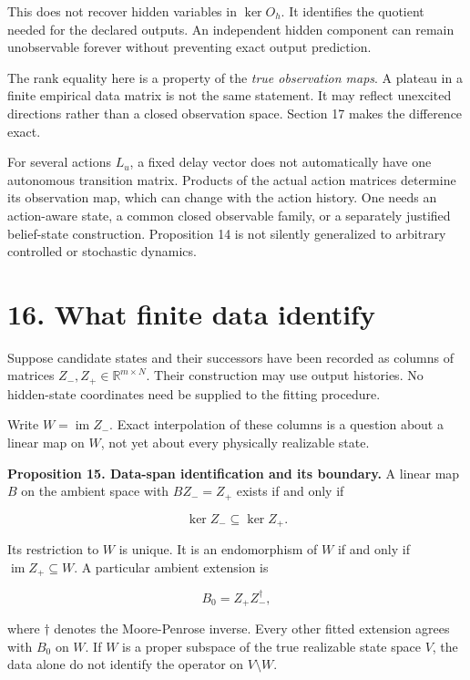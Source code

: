 \documentclass[11pt,letterpaper]{article}
\begin{document}
This does not recover hidden variables in \(\ker O_h\). It identifies
the quotient needed for the declared outputs. An independent hidden
component can remain unobservable forever without preventing exact
output prediction.

The rank equality here is a property of the \emph{true observation
maps}. A plateau in a finite empirical data matrix is not the same
statement. It may reflect unexcited directions rather than a closed
observation space. Section 17 makes the difference exact.

For several actions \(L_u\), a fixed delay vector does not automatically
have one autonomous transition matrix. Products of the actual action
matrices determine its observation map, which can change with the action
history. One needs an action-aware state, a common closed observable
family, or a separately justified belief-state construction. Proposition
14 is not silently generalized to arbitrary controlled or stochastic
dynamics.

\section{16. What finite data identify}\label{what-finite-data-identify}

Suppose candidate states and their successors have been recorded as
columns of matrices \(Z_-,Z_+\in\mathbb R^{m\times N}\). Their
construction may use output histories. No hidden-state coordinates need
be supplied to the fitting procedure.

Write \(W=\operatorname{im}Z_-\). Exact interpolation of these columns
is a question about a linear map on \(W\), not yet about every
physically realizable state.

\textbf{Proposition 15. Data-span identification and its boundary.} A
linear map \(B\) on the ambient space with \(BZ_-=Z_+\) exists if and
only if

\[
\ker Z_-\subseteq\ker Z_+.
\]

Its restriction to \(W\) is unique. It is an endomorphism of \(W\) if
and only if \(\operatorname{im}Z_+\subseteq W\). A particular ambient
extension is

\[
B_0=Z_+Z_-^\dagger,
\]

where \(\dagger\) denotes the Moore-Penrose inverse. Every other fitted
extension agrees with \(B_0\) on \(W\). If \(W\) is a proper subspace of
the true realizable state space \(V\), the data alone do not identify
the operator on \(V\setminus W\).
\end{document}
